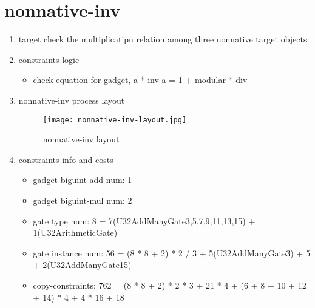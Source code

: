 \section{nonnative-inv}
\label{nonnative-inv}

\begin{enumerate}
    \item target
        check the multiplicatipn relation among three nonnative target objects.
    \item constraints-logic
        \begin{itemize}
            \item check equation for gadget,  a * inv-a = 1 + modular * div
        \end{itemize}
    \item nonnative-inv process layout
        \begin{figure}[!ht]
            \centering
            \texttt{[image: nonnative-inv-layout.jpg]}
            \caption{nonnative-inv layout}
            \label{fig:nonnative-inv-layout}
        \end{figure}
    
    \item constraints-info and costs
        \begin{itemize}
            \item gadget biguint-add num: 1
            \item gadget biguint-mul num: 2
            \item gate type num: 8 = 7(U32AddManyGate{3,5,7,9,11,13,15}) + 1(U32ArithmeticGate)
            \item gate instance num: 56 = (8 * 8 + 2) * 2 / 3 + 5(U32AddManyGate{3}) + 5 + 2(U32AddManyGate{15})
            \item copy-constraints: 762 = (8 * 8 + 2) * 2 * 3 + 21 * 4 + (6 + 8 + 10 + 12 + 14) * 4 + 4 * 16 + 18
        \end{itemize}

\end{enumerate}